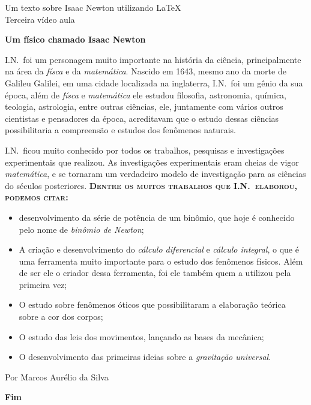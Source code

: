 \documentclass[12pt]{memoir}
\newcommand{\IsaacNewton}{I.N.}
\begin{document}
\begin{flushleft}

  \small  Um texto sobre Isaac Newton utilizando \LaTeX\\
  Terceira vídeo aula
  
\end{flushleft}
\begin{center}
  \LARGE

  \textbf{Um físico chamado Isaac Newton}
\end{center}  

\IsaacNewton\ foi um personagem muito importante na história da ciência, principalmente na área da \emph{físca} e da \emph{matemática}. Nascido em 1643, mesmo ano da morte de Galileu Galilei, em uma cidade localizada na inglaterra, \IsaacNewton\ foi um gênio da sua época, além de \emph{físca} e \emph{matemática} ele estudou filosofia, astronomia, química, teologia, astrologia, entre outras ciências, ele, juntamente  com vários outros cientistas e pensadores da época, acreditavam que o estudo dessas ciências possibilitaria a compreensão e estudos dos fenômenos naturais.

\IsaacNewton\ ficou muito conhecido por todos os trabalhos, pesquisas e investigações experimentais que realizou. As investigações experimentais eram cheias de vigor \emph{matemática}, e se tornaram um verdadeiro modelo de investigação para as ciências do séculos posteriores.\textbf{
  \textsc{Dentre os muitos trabalhos que \IsaacNewton\ elaborou, podemos citar:}}


\begin{itemize}
\item desenvolvimento da série de potência de um binômio, que hoje é conhecido pelo nome de \emph {binômio de Newton}; 
  
\item A criação e desenvolvimento do \emph{cálculo diferencial} e \emph{cálculo integral}, o que é uma ferramenta muito importante para o estudo dos fenômenos físicos. Além de ser ele o criador dessa ferramenta, foi ele também quem a utilizou pela primeira vez;
\item O estudo sobre fenômenos óticos que possibilitaram a elaboração teórica sobre a cor dos corpos;
\item O estudo das leis dos movimentos, lançando as bases da mecânica;
\item O desenvolvimento das primeiras ideias sobre a \emph {gravitação universal}.  
\end{itemize}

\begin{flushright}
  Por  Marcos Aurélio da Silva
\end{flushright}

\begin{center}
  \begin{Huge}
    \textbf{Fim}  
  \end{Huge}
\end{center}
\end{document}
